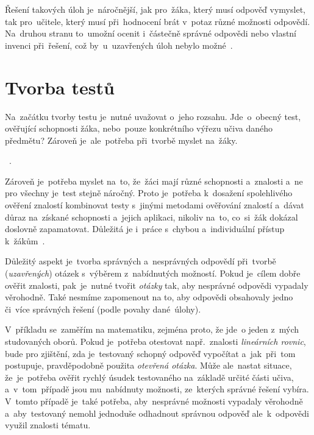 \documentclass[11pt,a4paper]{report}
\begin{document}
            Řešení takových úloh je~náročnější, jak pro~žáka, který musí odpověď vymyslet, tak pro~učitele, který musí při~hodnocení brát v~potaz různé možnosti odpovědí. Na~druhou stranu to~umožní ocenit i~částečně správné odpovědi nebo vlastní invenci při~řešení, což by~u~uzavřených úloh nebylo možné~\cite{rozhlasOUtazky}.

        \section{Tvorba testů}
            Na~začátku tvorby testu je~nutné uvažovat o~jeho rozsahu. Jde~o~obecný test, ověřující schopnosti žáka, nebo~pouze konkrétního výřezu učiva daného předmětu?
            Zároveň je~ale~potřeba při~tvorbě myslet na~žáky.

            ~\cite{Suchoradsky:testy}.

            Zároveň je~potřeba myslet na~to, že~žáci mají různé schopnosti a~znalosti a~ne pro všechny je~test stejně náročný. Proto je~potřeba k~dosažení spolehlivého ověření znalostí kombinovat testy s~jinými metodami ověřování znalostí a~dávat důraz na~získané schopnosti a~jejich aplikaci, nikoliv na~to, co~si~žák dokázal doslovně zapamatovat. Důležitá je i~práce s~chybou a~individuální přístup k~žákům~\cite{chraska:testy, Berkley2017LearningFromErrors}.
            
            Důležitý aspekt je~tvorba správných a~nesprávných odpovědí při~tvorbě (\emph{uzavřených}) otázek s~výběrem z~nabídnutých možností. Pokud je~cílem dobře ověřit znalosti, pak~je~nutné tvořit \emph{otázky} tak, aby nesprávné odpovědi vypadaly věrohodně. Také nesmíme zapomenout na to, aby odpovědi obsahovaly jedno či~více správných řešení (podle povahy dané~úlohy).

            V~příkladu se~zaměřím na matematiku, zejména proto, že jde~o jeden z~mých studovaných oborů. Pokud je~potřeba otestovat např.~znalosti \emph{lineárních rovnic}, bude pro zjištění, zda je~testovaný schopný odpověď vypočítat a~jak~při~tom postupuje, pravděpodobně použita \emph{otevřená otázka}. Může ale~nastat situace, že~je~potřeba ověřit rychlý úsudek testovaného na~základě určité části učiva, a~v~tom~případě jsou mu~nabídnuty možnosti, ze~kterých správné řešení vybíra. V~tomto případě je~také potřeba, aby~nesprávné možnosti vypadaly věrohodně a~aby~testovaný nemohl jednoduše odhadnout správnou odpověď ale~k~odpovědi využil znalosti tématu.
\end{document}
